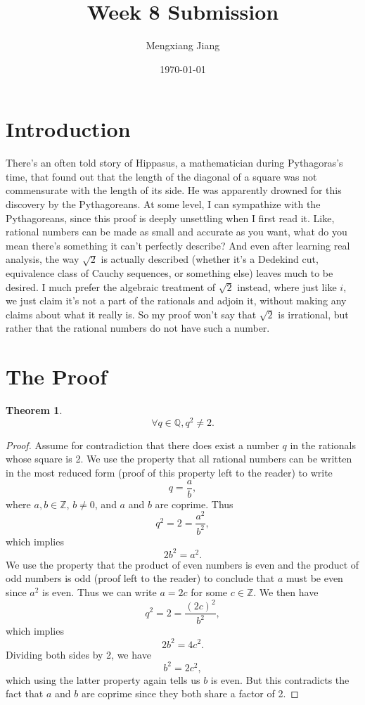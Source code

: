 \documentclass{article}
\title{Week 8 Submission}
\author{Mengxiang Jiang}
\date{\today}
\newtheorem{theorem}{Theorem}[section]
\begin{document}
\maketitle

\section{Introduction}
There's an often told story of Hippasus, a mathematician during 
Pythagoras's time, that found out that the length of the diagonal of 
a square was not commensurate with the length of its side. He was 
apparently drowned for this discovery by the Pythagoreans. At some 
level, I can sympathize with the Pythagoreans, since this proof
is deeply unsettling when I first read it. Like, rational numbers
can be made as small and accurate as you want, what do you mean
there's something it can't perfectly describe? And even after
learning real analysis, the way $\sqrt{2}$ is actually described
(whether it's a Dedekind cut, equivalence class of Cauchy
sequences, or something else) leaves much to be desired.
I much prefer the algebraic treatment of $\sqrt{2}$ instead,
where just like $i$, we just claim it's not a part of the rationals
and adjoin it, without making any claims about what it really is.
So my proof won't say that $\sqrt{2}$ is irrational, but rather
that the rational numbers do not have such a number.

\section{The Proof}
\begin{theorem}
$$\forall q \in \mathbb{Q}, q^2 \ne 2.$$
\end{theorem}

\begin{proof}
Assume for contradiction that there does exist a number $q$ in the rationals whose
square is 2. We use the property that all rational numbers can be written in the
most reduced form (proof of this property left to the reader) to write 
\[
    q = \frac{a}{b},
\] 
where $a, b \in \mathbb{Z}$, $b \ne 0$, and $a$ and $b$ are coprime.
Thus
\[
    q^2 = 2 = \frac{a^2}{b^2},
\]
which implies
\[
    2b^2 = a^2.
\]
We use the property that the product of even numbers is even and the product
of odd numbers is odd (proof left to the reader) to conclude that $a$ must be
even since $a^2$ is even. Thus we can write $a=2c$ for some $c \in \mathbb{Z}$.
We then have
\[
    q^2 = 2 = \frac{(2c)^2}{b^2},
\]
which implies
\[
    2b^2 = 4c^2.
\]
Dividing both sides by 2, we have
\[
    b^2 = 2c^2,
\]
which using the latter property again tells us $b$ is even. But this
contradicts the fact that $a$ and $b$ are coprime since they both share
a factor of 2.
\end{proof}
\end{document}
